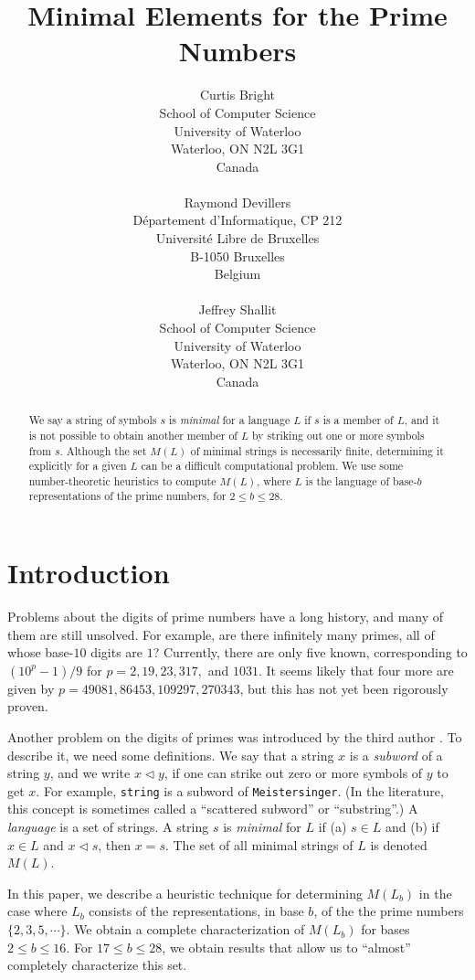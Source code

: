 \documentclass[12pt]{article}
\title{Minimal Elements for the Prime Numbers}
\author{Curtis Bright\\
School of Computer Science\\
University of Waterloo\\
Waterloo, ON  N2L 3G1\\
Canada\\
\ \\
Raymond Devillers\\
D\'epartement d'Informatique, CP 212\\
Universit\'e Libre de Bruxelles \\
B-1050 Bruxelles\\
Belgium\\
\ \\
Jeffrey Shallit \\
School of Computer Science\\
University of Waterloo\\
Waterloo, ON  N2L 3G1\\
Canada}
\def\subw{\triangleleft}
\theoremstyle{plain}
\theoremstyle{definition}
\theoremstyle{remark}
\begin{document}
\maketitle

\begin{abstract}
We say a string of symbols $s$ is {\it minimal} for a language $L$
if $s$ is a member of $L$, and it is not possible to obtain another 
member of $L$ by striking out one or more symbols from $s$.  Although
the set $M(L)$ of minimal strings is necessarily finite, determining
it explicitly for a given $L$ can be a difficult computational problem.  
We use some number-theoretic heuristics to compute $M(L)$, where $L$
is the language of base-$b$ representations of the prime numbers,
for $2 \leq b \leq 28$.
\end{abstract}

\section{Introduction}

Problems about the digits of prime numbers have a long history, and many
of them are still unsolved.  For example, are there infinitely many
primes, all of whose base-$10$ digits are $1$?  Currently,
there are only five
known, corresponding to $(10^p-1)/9$ for $p = 2, 19, 23, 317, $ and
$1031$.    It seems likely that four more are given by
$p = 49081, 86453, 109297, 270343$, but this has not yet been
rigorously proven.

Another problem on the digits of primes was introduced by the
third author \cite{Sh00}.  To describe it, we need some definitions.
We say that a string $x$ is a {\it subword} of a string $y$, and 
we write $x \subw y$, if 
one can strike out zero or more symbols of $y$ to get $x$.
For example, {\tt string} is a subword of
{\tt Meistersinger}.  
(In the literature, this concept is sometimes called a ``scattered
subword'' or ``substring''.)
A {\it language} is a set of strings.  A string $s$ is {\it minimal}
for $L$ if  (a) $s \in L$ and (b) if $x \in L$ and $x \subw s$, then
$x = s$.    The set of all minimal strings of $L$ is denoted $M(L)$.

In this paper, we describe a heuristic
technique for determining $M(L_b)$ in the
case where $L_b$ consists of the representations, in base $b$, of the
the prime numbers $\lbrace 2, 3, 5, \cdots \rbrace$.  We obtain
a complete characterization of $M(L_b)$ for bases
$2 \leq b \leq 16$.   For $17 \leq b \leq 28$, we obtain
results that allow us to ``almost'' completely characterize this set.
\end{document}
